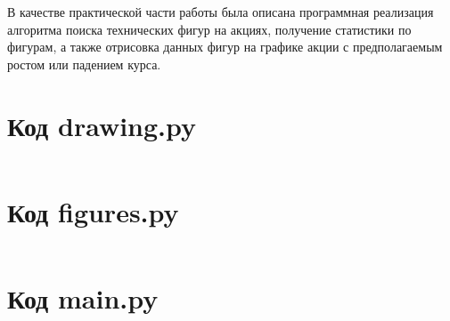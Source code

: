 \documentclass[bachelor, och, coursework]{SCWorks}
\begin{document}
    В качестве практической части работы была описана программная реализация
    алгоритма поиска технических фигур на акциях, получение статистики по
    фигурам, а также отрисовка данных фигур на графике акции с предполагаемым
    ростом или падением курса.


    
    

    


\appendix

    \section{Код drawing.py}
    \inputminted[fontsize=\footnotesize]{text}{code/drawing.py}

    \section{Код figures.py}
    \inputminted[fontsize=\footnotesize]{text}{code/figures.py}

    \section{Код main.py}
    \inputminted[fontsize=\footnotesize]{text}{code/main.py}
\end{document}
